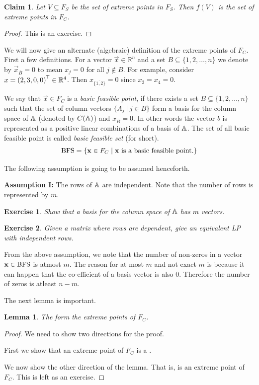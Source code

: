 \documentclass[12pt,
    driverfallback=dvipdfm,
 	openany,
    a4paper,
    toc=bibliography,
    twoside,
    numbers=noenddot]{book}              %
\newtheorem{exercise}{Exercise}[chapter]
\newtheorem{lemma}[theorem]{Lemma}
\newtheorem{claim}[theorem]{Claim}
\newcommand{\Reals}{\mathbb{R}}
\newcommand{\Rn}{\Reals^n}
\begin{document}
\begin{claim}
Let $V \subseteq F_S$ be the set of extreme points in $F_S$. Then $f(V)$ is the set of extreme points in $F_C$.
\end{claim}
\begin{proof}
This is an exercise.
\end{proof}

We will now give an alternate (algebraic) definition of the extreme points of $F_C$. First a few definitions. For a vector $\vec x \in \Rn$ and a set $B \subseteq \{1,2,\dots,n\}$ we denote by $\vec{x}_{\overline B} = 0$ to mean $x_j = 0$ for all $j \notin B$. For example, consider $x = \trans{(2,3,0,0)} \in \Reals^4$. Then $x_{\overline{\{1,2\}}} = 0$ since $x_3=x_4 = 0$.

We say that $\vec x \in F_C$ is a \emph{basic feasible point}, if there exists a set $B \subseteq \{1,2,\dots,n\}$ such that the set of column vectors $\{A_j ~|~ j \in B\}$ form a basis for the column space of ${\mathbb A}$ (denoted by $C({\mathbb A})$) and $x_{\overline B} = 0$. In other words the vector $b$ is represented as a positive linear combinations of a basis of ${\mathbb A}$. The set of all basic feasible point is called \emph{basic feasible set} (\BFS for short).
\[
\mathrm{BFS} = \{\mathbf x \in F_C \mid \mathbf x \text{ is a basic feasible point.}\}
\]

The following assumption is going to be assumed henceforth.
\begin{mdframed}[backgroundcolor=light-gray, linecolor=light-gray]
{\bf Assumption I:} The rows of ${\mathbb A}$ are independent. Note that the number of rows is represented by $m$.
\begin{exercise}
Show that a basis for the column space of ${\mathbb A}$ has $m$ vectors.
\end{exercise}

\begin{exercise}
Given a matrix where rows are dependent, give an equivalent LP with independent rows.
\end{exercise}
\end{mdframed}

From the above assumption, we note that the number of non-zeros in a vector $\mathbf x \in \mathrm{BFS}$ is atmost $m$. The reason for at most $m$ and not exact $m$ is because it can happen that the co-efficient of a basis vector is also $0$. Therefore the number of zeros is atleast $n-m$. 

The next lemma is important.
\begin{lemma}
\label{lem:BFS}
The \BFS form the extreme points of $F_C$.
\end{lemma}
\begin{proof}
We need to show two directions for the proof. 

First we show that an extreme point of $F_C$ is a \BFS. 

We now show the other direction of the lemma. That is,  \BFS is an extreme point of $F_C$. This is left as an exercise.
\end{proof}
\end{document}
